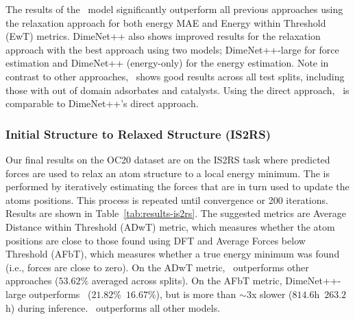 The results of the \model~model significantly outperform all previous approaches using the relaxation approach for both energy MAE and Energy within Threshold (EwT) metrics. DimeNet++ also shows improved results for the relaxation approach with the best approach using two models; DimeNet++-large for force estimation and DimeNet++ (energy-only) for the energy estimation. Note in contrast to other approaches, \model~shows good results across all test splits, including those with out of domain adsorbates and catalysts. Using the direct approach, \model~is comparable to DimeNet++'s direct approach. 






\subsubsection{Initial Structure to Relaxed Structure (IS2RS)}

Our final results on the OC20 dataset are on the IS2RS task where predicted forces are used to relax an atom structure to a local energy minimum. The is performed by iteratively estimating the forces that are in turn used to update the atoms positions. This process is repeated until convergence or 200 iterations. Results are shown in Table~\ref{tab:results-is2rs}. The suggested metrics are  Average Distance within Threshold (ADwT) metric, which measures whether the atom positions are close to those found using DFT
and Average Forces below Threshold (AFbT), which measures whether a true energy minimum was found (i.e., forces are close to zero). On the ADwT metric, \model~outperforms other approaches ($53.62\%$ averaged across splits).
On the AFbT metric, DimeNet++-large outperforms \model~($21.82\%$~\vs $16.67\%$),
but is more than ${\sim}3$x slower ($814.6$h~\vs $263.2$h) during inference. \model~outperforms all other models.

